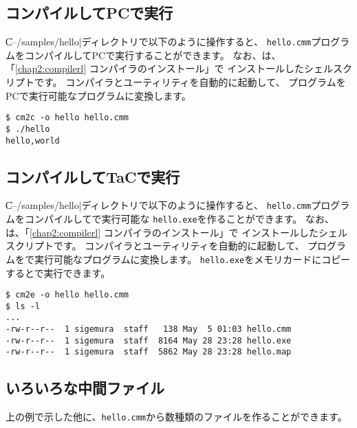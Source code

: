 \subsection{コンパイルしてPCで実行}

\|C--/samples/hello|ディレクトリで以下のように操作すると、
{\tt hello.cmm}プログラムをコンパイルしてPCで実行することができます。
なお、{\cmc}は、「\ref{chap2:compilerl} コンパイラのインストール」で
インストールしたシェルスクリプトです。
コンパイラとユーティリティを自動的に起動して、
{\cmml}プログラムをPCで実行可能なプログラムに変換します。

\begin{mylist}
\begin{verbatim}
$ cm2c -o hello hello.cmm 
$ ./hello
hello,world
\end{verbatim}
\end{mylist}

\subsection{コンパイルしてTaCで実行}

\|C--/samples/hello|ディレクトリで以下のように操作すると、
{\tt hello.cmm}プログラムをコンパイルして{\tac}で実行可能な
{\tt hello.exe}を作ることができます。
なお、{\cme}は、「\ref{chap2:compilerl} コンパイラのインストール」で
インストールしたシェルスクリプトです。
コンパイラとユーティリティを自動的に起動して、
{\cmml}プログラムを{\tac}で実行可能なプログラムに変換します。
{\tt hello.exe}をメモリカードにコピーすると{\tac}で実行できます。

\begin{mylist}
\begin{verbatim}
$ cm2e -o hello hello.cmm 
$ ls -l
...
-rw-r--r--  1 sigemura  staff   138 May  5 01:03 hello.cmm
-rw-r--r--  1 sigemura  staff  8164 May 28 23:28 hello.exe
-rw-r--r--  1 sigemura  staff  5862 May 28 23:28 hello.map
\end{verbatim}
\end{mylist}

\subsection{いろいろな中間ファイル}

上の例で示した他に、{\tt hello.cmm}から数種類のファイルを作ることができます。

